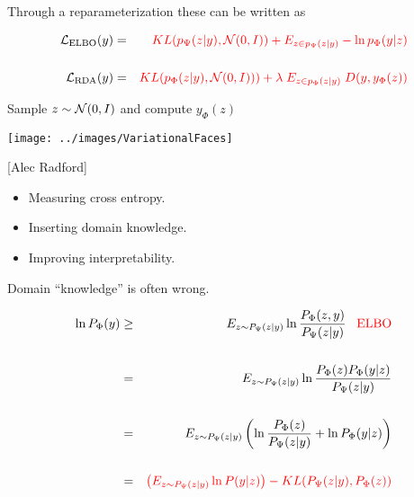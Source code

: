 {\vfill
Through a reparameterization these can be written as

\begin{eqnarray*}
{\cal L}_{\mathrm{ELBO}}(y) & = & {\color{red}  KL(p_\Psi(z|y),{\cal N}(0,I)) + E_{z \in p_\Psi(z|y)} - \ln p_\Phi(y|z)} \\
\\
{\cal L}_{\mathrm{RDA}}(y) & = & {\color{red}  KL(p_\Phi(z|y),{\cal N}(0,I))) + \lambda\;E_{z \in p_\Phi(z|y)}\; D(y,y_\Phi(z))}
\end{eqnarray*}


\centerline{Sample {\color{red} $z \sim {\cal N}(0,I)$} and compute {\color{red} $y_\Phi(z)$}}

\vfill
\centerline{\texttt{[image: ../images/VariationalFaces]}}
\centerline{[Alec Radford]}


\begin{itemize}
\item Measuring cross entropy.

\vfill
\item Inserting domain knowledge.

\vfill
\item Improving interpretability.
\end{itemize}


\centerline{Domain ``knowledge'' is often wrong.}



}


{\huge
\begin{eqnarray*}
        \ln P_\Phi(y) & \geq & E_{z \sim P_\Psi(z|y)} \ln \frac{P_\Phi(z,y)}{P_\Psi(z|y)}\;\;\;\mbox{\color{red} ELBO} \\
        \\
        & = & E_{z \sim P_\Psi(z|y)} \ln \frac{P_\Phi(z)P_\Phi(y|z)}{P_\Psi(z|y)} \\
        \\
        & = & E_{z \sim P_\Psi(z|y)} \left(\ln \frac{P_\Phi(z)}{P_\Psi(z|y)} +\ln P_\Phi(y|z)\right) \\
        \\
        & = & {\color{red} \left(E_{z \sim P_\Psi(z|y)} \ln P(y|z)\right) - KL(P_\Psi(z|y),P_\Phi(z))}
\end{eqnarray*}
}

